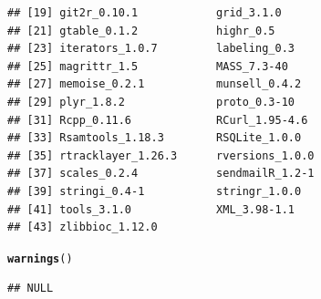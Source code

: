 \documentclass[11pt]{article}\usepackage[]{graphicx}\usepackage[]{color}
\makeatletter
\newcommand{\hlstd}[1]{\textcolor[rgb]{0.345,0.345,0.345}{#1}}%
\newcommand{\hlkwd}[1]{\textcolor[rgb]{0.737,0.353,0.396}{\textbf{#1}}}%
\newenvironment{kframe}{%
 \def\at@end@of@kframe{}%
 \ifinner\ifhmode%
  \def\at@end@of@kframe{\end{minipage}}%
  \begin{minipage}{\columnwidth}%
 \fi\fi%
 \def\FrameCommand##1{\hskip\@totalleftmargin \hskip-\fboxsep
 \colorbox{shadecolor}{##1}\hskip-\fboxsep
     \hskip-\linewidth \hskip-\@totalleftmargin \hskip\columnwidth}%
 \MakeFramed {\advance\hsize-\width
   \@totalleftmargin\z@ \linewidth\hsize
   \@setminipage}}%
 {\par\unskip\endMakeFramed%
 \at@end@of@kframe}
\newenvironment{knitrout}{}{} %
\makeatother
\begin{document}
\begin{scriptsize}
\begin{knitrout}
\begin{kframe}
\begin{verbatim}
## [19] git2r_0.10.1            grid_3.1.0             
## [21] gtable_0.1.2            highr_0.5              
## [23] iterators_1.0.7         labeling_0.3           
## [25] magrittr_1.5            MASS_7.3-40            
## [27] memoise_0.2.1           munsell_0.4.2          
## [29] plyr_1.8.2              proto_0.3-10           
## [31] Rcpp_0.11.6             RCurl_1.95-4.6         
## [33] Rsamtools_1.18.3        RSQLite_1.0.0          
## [35] rtracklayer_1.26.3      rversions_1.0.0        
## [37] scales_0.2.4            sendmailR_1.2-1        
## [39] stringi_0.4-1           stringr_1.0.0          
## [41] tools_3.1.0             XML_3.98-1.1           
## [43] zlibbioc_1.12.0
\end{verbatim}
\begin{alltt}
\hlkwd{warnings}\hlstd{()}
\end{alltt}
\begin{verbatim}
## NULL
\end{verbatim}
\end{kframe}
\end{knitrout}
\end{scriptsize}
\end{document}

